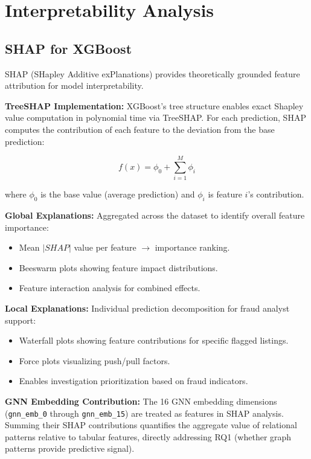 \section{Interpretability Analysis}
\label{sec:3_10}

\subsection{SHAP for XGBoost}

SHAP (SHapley Additive exPlanations) provides theoretically grounded feature attribution for model interpretability.

\textbf{TreeSHAP Implementation:} XGBoost's tree structure enables exact Shapley value computation in polynomial time via TreeSHAP. For each prediction, SHAP computes the contribution of each feature to the deviation from the base prediction:

\begin{equation}
f(x) = \phi_0 + \sum_{i=1}^{M} \phi_i
\end{equation}

where $\phi_0$ is the base value (average prediction) and $\phi_i$ is feature $i$'s contribution.

\textbf{Global Explanations:} Aggregated across the dataset to identify overall feature importance:
\begin{itemize}
    \item Mean $|SHAP|$ value per feature $\rightarrow$ importance ranking.
    \item Beeswarm plots showing feature impact distributions.
    \item Feature interaction analysis for combined effects.
\end{itemize}

\textbf{Local Explanations:} Individual prediction decomposition for fraud analyst support:
\begin{itemize}
    \item Waterfall plots showing feature contributions for specific flagged listings.
    \item Force plots visualizing push/pull factors.
    \item Enables investigation prioritization based on fraud indicators.
\end{itemize}

\textbf{GNN Embedding Contribution:} The 16 GNN embedding dimensions (\texttt{gnn\_emb\_0} through \texttt{gnn\_emb\_15}) are treated as features in SHAP analysis. Summing their SHAP contributions quantifies the aggregate value of relational patterns relative to tabular features, directly addressing RQ1 (whether graph patterns provide predictive signal).
